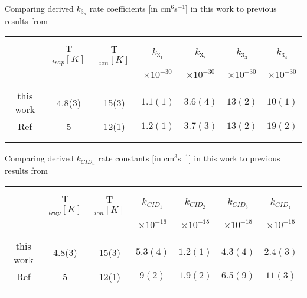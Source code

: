\begin{threeparttable}[!htb]
    \centering
    \caption{Comparing derived $k_{3_n}$ rate coefficients [in cm$^6$s$^{-1}$] in this work to previous results from \citet{Brunken2017}}
     \begin{tabular}{ccccccc}
        \hline\\
        & T$_{trap} [K]$ & T$_{ion} [K]$& $k_{3_1}$ &  $k_{3_2}$ & $k_{3_3}$ & $k_{3_4}$ \\
        &&& $\times 10^{-30}$ & $\times 10^{-30}$ & $\times 10^{-30}$ & $\times 10^{-30}$\\
        \\\hline\hline\\
        this work & 4.8(3) & 15(3) & $1.1(1)$ & $3.6(4)$ & $13(2)$ & $10(1)$ \\
        Ref \cite{Brunken2017} & 5 & 12(1) & $1.2(1)$ & $3.7(3)$ & $13(2)$ & $19(2)$ \\
        \\\hline\hline\\
    \end{tabular}
    \label{tab:k3:rate-constants}
\end{threeparttable}

\begin{threeparttable}[!htb]
    \centering
    \caption{Comparing derived  $k_{CID_n}$ rate constants [in cm$^3$s$^{-1}$] in this work to previous results from \citet{Brunken2017}}
    \begin{tabular}{ccccccc}
        \hline\\
        & T$_{trap} [K]$ & T$_{ion} [K]$& $k_{CID_1}$ &  $k_{CID_2}$ & $k_{CID_3}$ & $k_{CID_4}$ \\
        &&& $\times 10^{-16}$ & $\times 10^{-15}$ & $\times 10^{-15}$ & $\times 10^{-15}$\\
        \\\hline\hline\\
        this work & 4.8(3) &  15(3) & $5.3(4)$ & $1.2(1)$ & $4.3(4)$ & $2.4(3)$ \\
        Ref \cite{Brunken2017} & 5 & 12(1) & $9(2)$ & $1.9(2)$ & $6.5(9)$ & $11(3)$ \\
        \\\hline\hline\\
    \end{tabular}
    \label{tab:kCID:rate-constants}
\end{threeparttable}
